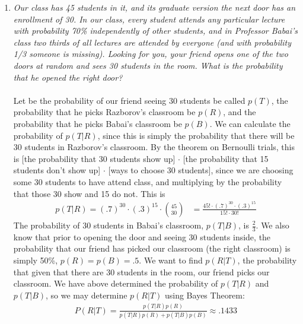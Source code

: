 \documentclass[12pt]{article}
\begin{document}
\begin{enumerate}
\item\emph{Our class has 45 students in it, and its graduate version the next
door has an enrollment of 30. In our class, every student attends
any particular lecture with probability 70\% independently of other
students, and in Professor Babai's class two thirds of all lectures are
attended by everyone (and with probability 1/3 someone is missing).
Looking for you, your friend opens one of the two doors at random and
sees 30 students in the room. What is the probability that he opened
the right door?} \\
\\
Let be the probability of our friend seeing 30 students be called $p(T)$, the probability that he picks Razborov's classroom be $p(R)$, and the probability that he picks Babai's classroom be $p(B)$. We can calculate the probability of $p(T|R)$, since this is simply the probability that there will be 30 students in Razborov's classroom. By the theorem on Bernoulli trials, this is [the probability that 30 students show up] $\cdot$ [the probability that 15 students don't show up] $\cdot$ [ways to choose 30 students], since we are choosing some 30 students to have attend class, and multiplying by the probability that those 30 show and 15 do not. This is
\begin{align}
\nonumber p(T|R) = (.7)^{30} \cdot (.3)^{15} \cdot \binom{45}{30} &= \frac{45! \cdot (.7)^{30} \cdot (.3)^{15}}{15! \cdot 30!}
\end{align}
The probability of 30 students in Babai's classroom, $p(T|B)$, is $\frac{2}{3}$. We also know that prior to opening the door and seeing 30 students inside, the probability that our friend has picked our classroom (the right classroom) is simply 50\%, $p(R) = p(B) = .5$. We want to find $p(R|T)$, the probability that given that there are 30 students in the room, our friend picks our classroom. We have above determined the probability of $p(T|R)$ and $p(T|B)$, so we may determine $p(R|T)$ using Bayes Theorem:
\begin{align}
\nonumber P(R|T) = \frac{p(T|R)p(R)}{p(T | R)p(R) + p(T|B)p(B)} \approx .1433
\end{align}




\end{enumerate}
\end{document}
